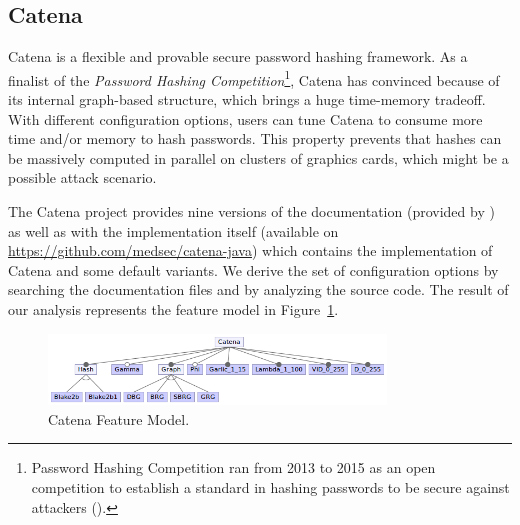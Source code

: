


\subsection{Catena}

Catena is a flexible and provable secure password hashing framework. As a finalist of the \textit{Password Hashing Competition}\footnote{Password Hashing Competition ran from 2013 to 2015 as an open competition to establish a standard in hashing passwords to be secure against attackers (\cite{phc2015}).}, Catena has convinced because of its internal graph-based structure, which brings a huge time-memory tradeoff. With different configuration options, users can tune Catena to consume more time and/or memory to hash passwords. This property prevents that hashes can be massively computed in parallel on clusters of graphics cards, which might be a possible attack scenario. 

The Catena project provides nine versions of the documentation (provided by \cite{catena2014medsec}) as well as with the implementation itself (available on \url{https://github.com/medsec/catena-java}) which contains the implementation of Catena and some default variants. We derive the set of configuration options by searching the documentation files and by analyzing the source code. The result of our analysis represents the feature model in Figure~\ref{fm_catena}.

\begin{figure}
  \centering
  \includegraphics[width=0.8\textwidth]{images/Catena_Feature_model}
  \caption{Catena Feature Model.}
  \label{fm_catena}
\end{figure}


